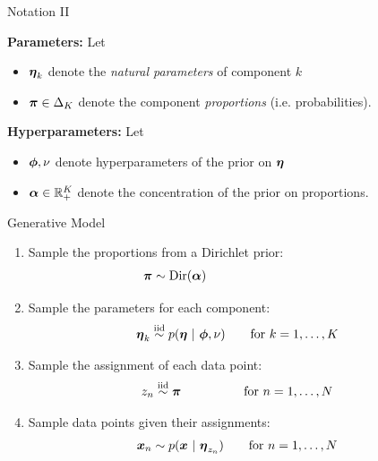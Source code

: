 \documentclass[aspectratio=169]{beamer}
\begin{document}
\begin{frame}{Notation II}

\textbf{Parameters:} Let
\begin{itemize}
    \item $\boldsymbol{\eta}_k$ denote the \textit{natural parameters} of component $k$
    \item $\boldsymbol{\pi} \in \Delta_K$ denote the component \textit{proportions} (i.e. probabilities).
\end{itemize}

\textbf{Hyperparameters:} Let
\begin{itemize}
    \item $\boldsymbol{\phi}, \nu$ denote hyperparameters of the prior on $\boldsymbol{\eta}$
    \item $\boldsymbol{\alpha} \in \mathbb{R}_+^{K}$ denote the concentration of the prior on proportions.
\end{itemize}
    
\end{frame}

\begin{frame}{Generative Model}

\begin{enumerate}
    \item Sample the proportions from a Dirichlet prior:
    \begin{align}
        \mbpi &\sim \distDirichlet(\mbalpha) \hspace{10em}
    \end{align}
    
    \item Sample the parameters for each component:
    \begin{align}
        \boldsymbol{\eta}_k &\stackrel{\text{iid}}{\sim} p(\boldsymbol{\eta} ~\vert~ \boldsymbol{\phi}, \nu) \qquad \text{for } k = 1, \ldots, K
    \end{align}
    
    \item Sample the assignment of each data point:
    \begin{align}
        z_n &\stackrel{\text{iid}}{\sim} \boldsymbol{\pi} \hspace{3em} \qquad \text{for } n = 1, \ldots, N
    \end{align}
    
    \item Sample data points given their assignments:
    \begin{align}
        \boldsymbol{x}_n &\sim p(\boldsymbol{x} ~\vert~ \boldsymbol{\eta}_{z_n}) \qquad \text{for } n = 1, \ldots, N
    \end{align}
\end{enumerate}
    
\end{frame}
\end{document}
